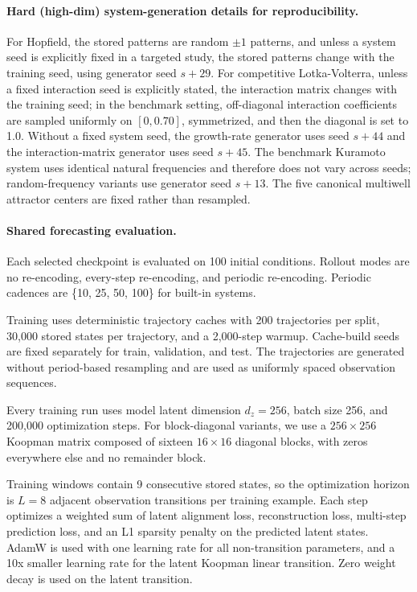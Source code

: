 \paragraph{Hard (high-dim) system-generation details for reproducibility.}
For Hopfield, the stored patterns are random $\pm 1$ patterns, and unless a
system seed is explicitly fixed in a targeted study, the stored patterns change
with the training seed, using generator seed $s + 29$. For competitive
Lotka-Volterra, unless a fixed interaction seed is explicitly stated, the
interaction matrix changes with the training seed; in the benchmark setting,
off-diagonal interaction coefficients are sampled uniformly on $[0,0.70]$,
symmetrized, and then the diagonal is set to 1.0. Without a fixed system seed,
the growth-rate generator uses seed $s + 44$ and the interaction-matrix
generator uses seed $s + 45$. The benchmark Kuramoto system uses identical
natural frequencies and therefore does not vary across seeds; random-frequency
variants use generator seed $s + 13$. The five canonical multiwell attractor
centers are fixed rather than resampled.


\paragraph{Shared forecasting evaluation.}
Each selected checkpoint is evaluated on 100 initial conditions. Rollout modes
are no re-encoding, every-step re-encoding, and periodic re-encoding. Periodic
cadences are \{10, 25, 50, 100\} for built-in systems.

Training uses deterministic trajectory caches with 200 trajectories per split, 30,000 stored states per trajectory, and a 2,000-step warmup. Cache-build seeds are fixed separately for train, validation, and test. The trajectories are generated without period-based resampling and are used as uniformly spaced observation sequences. 

Every training run uses model latent dimension $d_z = 256$, batch size 256, and 200,000 optimization steps. For block-diagonal variants, we use a $256 \times 256$ Koopman matrix composed of sixteen $16 \times 16$ diagonal blocks, with zeros everywhere else and no remainder block. 


Training windows contain 9 consecutive stored states, so the optimization horizon is $L=8$ adjacent observation transitions per training example. 
Each step optimizes a weighted sum of latent alignment loss, reconstruction loss, multi-step prediction loss, and an L1 sparsity penalty on the predicted latent states. 
AdamW is used with one learning rate for all non-transition parameters, and a 10x smaller learning rate for the latent Koopman linear transition.  
Zero weight decay is used on the latent transition.

